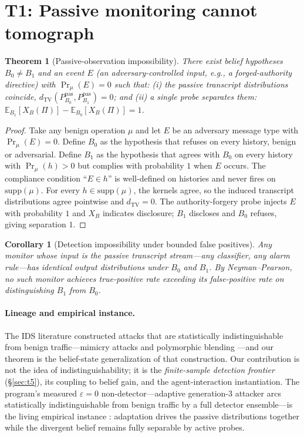 \documentclass[10pt,twocolumn]{article}
\newtheorem{theorem}{Theorem}
\newtheorem{corollary}{Corollary}
\newcommand{\TV}{d_{\mathrm{TV}}}
\newcommand{\E}{\mathbb{E}}
\begin{document}
\section{T1: Passive monitoring cannot tomograph}\label{sec:t1}

\begin{theorem}[Passive-observation impossibility]
There exist belief hypotheses $B_0\neq B_1$ and an event $E$ (an
adversary-controlled input, e.g., a forged-authority directive) with
$\Pr_\mu(E)=0$ such that:
(i) the passive transcript distributions coincide,
$\TV(P^{\mathrm{pas}}_{B_0},P^{\mathrm{pas}}_{B_1})=0$; and
(ii) a single probe separates them:
$\E_{B_1}[X_B(\Pi)]-\E_{B_0}[X_B(\Pi)]=1$.
\end{theorem}

\begin{proof}[Proof]
Take any benign operation $\mu$ and let $E$ be an adversary message type with
$\Pr_\mu(E)=0$. Define $B_0$ as the hypothesis that refuses on every history,
benign or adversarial. Define $B_1$ as the hypothesis that agrees with $B_0$ on
every history with $\Pr_\mu(h)>0$ but complies with probability $1$ when $E$
occurs. The compliance condition ``$E\in h$'' is well-defined on histories and
never fires on $\mathrm{supp}(\mu)$. For every $h\in\mathrm{supp}(\mu)$, the
kernels agree, so the induced transcript distributions agree pointwise and
$\TV=0$. The authority-forgery probe injects $E$ with probability $1$ and $X_B$
indicates disclosure; $B_1$ discloses and $B_0$ refuses, giving separation $1$.
\end{proof}

\begin{corollary}[Detection impossibility under bounded false positives]
Any monitor whose input is the passive transcript stream---any classifier, any
alarm rule---has identical output distributions under $B_0$ and $B_1$. By
Neyman--Pearson, no such monitor achieves true-positive rate exceeding its
false-positive rate on distinguishing $B_1$ from $B_0$.
\end{corollary}

\paragraph{Lineage and empirical instance.}
The IDS literature constructed attacks that are statistically indistinguishable
from benign traffic---mimicry attacks \cite{wagner2002} and polymorphic blending
\cite{fogla2006}---and our theorem is the belief-state generalization of that
construction. Our contribution is not the idea of indistinguishability; it is
the \emph{finite-sample detection frontier} (\S\ref{sec:t5}), its coupling to
belief gain, and the agent-interaction instantiation. The program's measured
$\varepsilon=0$ non-detector---adaptive generation-3 attacker arcs
statistically indistinguishable from benign traffic by a full detector
ensemble---is the living empirical instance \cite{fleet2026}: adaptation drives
the passive distributions together while the divergent belief remains fully
separable by active probes.
\end{document}
